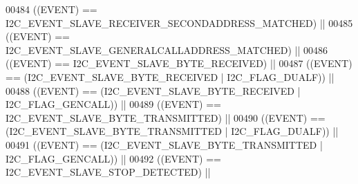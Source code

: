 \begin{DoxyCode}
00484                              \textcolor{preprocessor}{(}\textcolor{preprocessor}{(}\textcolor{preprocessor}{EVENT}\textcolor{preprocessor}{)} \textcolor{preprocessor}{==} 
      I2C_EVENT_SLAVE_RECEIVER_SECONDADDRESS_MATCHED\textcolor{preprocessor}{)} \textcolor{preprocessor}{||}
00485                              \textcolor{preprocessor}{(}\textcolor{preprocessor}{(}\textcolor{preprocessor}{EVENT}\textcolor{preprocessor}{)} \textcolor{preprocessor}{==} 
      I2C_EVENT_SLAVE_GENERALCALLADDRESS_MATCHED\textcolor{preprocessor}{)} \textcolor{preprocessor}{||}
00486                              \textcolor{preprocessor}{(}\textcolor{preprocessor}{(}\textcolor{preprocessor}{EVENT}\textcolor{preprocessor}{)} \textcolor{preprocessor}{==} I2C_EVENT_SLAVE_BYTE_RECEIVED\textcolor{preprocessor}{)} \textcolor{preprocessor}{||}
00487                              \textcolor{preprocessor}{(}\textcolor{preprocessor}{(}\textcolor{preprocessor}{EVENT}\textcolor{preprocessor}{)} \textcolor{preprocessor}{==} \textcolor{preprocessor}{(}I2C_EVENT_SLAVE_BYTE_RECEIVED \textcolor{preprocessor}{|} 
      I2C_FLAG_DUALF\textcolor{preprocessor}{)}\textcolor{preprocessor}{)} \textcolor{preprocessor}{||}
00488                              \textcolor{preprocessor}{(}\textcolor{preprocessor}{(}\textcolor{preprocessor}{EVENT}\textcolor{preprocessor}{)} \textcolor{preprocessor}{==} \textcolor{preprocessor}{(}I2C_EVENT_SLAVE_BYTE_RECEIVED \textcolor{preprocessor}{|} 
      I2C_FLAG_GENCALL\textcolor{preprocessor}{)}\textcolor{preprocessor}{)} \textcolor{preprocessor}{||}
00489                              \textcolor{preprocessor}{(}\textcolor{preprocessor}{(}\textcolor{preprocessor}{EVENT}\textcolor{preprocessor}{)} \textcolor{preprocessor}{==} I2C_EVENT_SLAVE_BYTE_TRANSMITTED\textcolor{preprocessor}{)} \textcolor{preprocessor}{||}
00490                              \textcolor{preprocessor}{(}\textcolor{preprocessor}{(}\textcolor{preprocessor}{EVENT}\textcolor{preprocessor}{)} \textcolor{preprocessor}{==} \textcolor{preprocessor}{(}I2C_EVENT_SLAVE_BYTE_TRANSMITTED \textcolor{preprocessor}{|} 
      I2C_FLAG_DUALF\textcolor{preprocessor}{)}\textcolor{preprocessor}{)} \textcolor{preprocessor}{||}
00491                              \textcolor{preprocessor}{(}\textcolor{preprocessor}{(}\textcolor{preprocessor}{EVENT}\textcolor{preprocessor}{)} \textcolor{preprocessor}{==} \textcolor{preprocessor}{(}I2C_EVENT_SLAVE_BYTE_TRANSMITTED \textcolor{preprocessor}{|} 
      I2C_FLAG_GENCALL\textcolor{preprocessor}{)}\textcolor{preprocessor}{)} \textcolor{preprocessor}{||}
00492                              \textcolor{preprocessor}{(}\textcolor{preprocessor}{(}\textcolor{preprocessor}{EVENT}\textcolor{preprocessor}{)} \textcolor{preprocessor}{==} I2C_EVENT_SLAVE_STOP_DETECTED\textcolor{preprocessor}{)} \textcolor{preprocessor}{||}

\end{DoxyCode}
